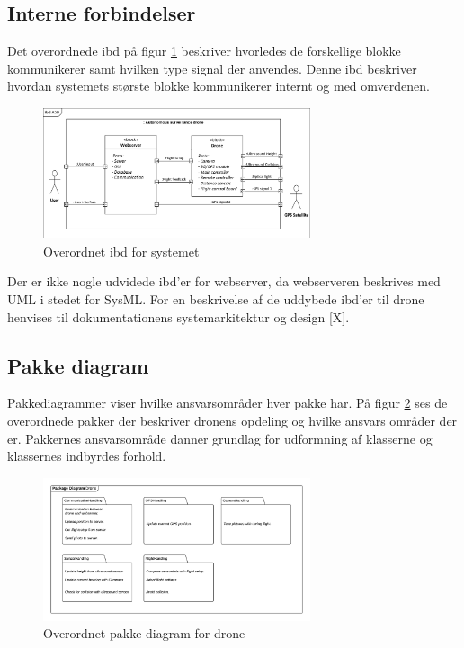 \subsection{Interne forbindelser}

Det overordnede ibd på figur \ref{fig:ibd_asd} beskriver hvorledes de forskellige blokke kommunikerer samt hvilken type signal der anvendes.
Denne ibd beskriver hvordan systemets største blokke kommunikerer internt og med omverdenen. 

\begin{figure}[H]
	\centering
	\includegraphics[width=0.7\textwidth]{Billeder/Projektbeskrivelse/ibd1_overordnet.pdf}
	\caption{Overordnet ibd for systemet}
	\label{fig:ibd_asd}
\end{figure}

Der er ikke nogle udvidede ibd'er for webserver, da webserveren beskrives med UML i stedet for SysML. 
For en beskrivelse af de uddybede ibd'er til drone henvises til dokumentationens systemarkitektur og design [X].

\subsection{Pakke diagram}

Pakkediagrammer viser hvilke ansvarsområder hver pakke har.
På figur \ref{fig:package_drone} ses de overordnede pakker der beskriver dronens opdeling og hvilke ansvars områder der er.
Pakkernes ansvarsområde danner grundlag for udformning af klasserne og klassernes indbyrdes forhold.
 
\begin{figure}[H]
	\centering
	\includegraphics[width=0.7\textwidth]{Billeder/Projektbeskrivelse/Packagediagram_drone}
	\caption{Overordnet pakke diagram for drone}
	\label{fig:package_drone}
\end{figure}